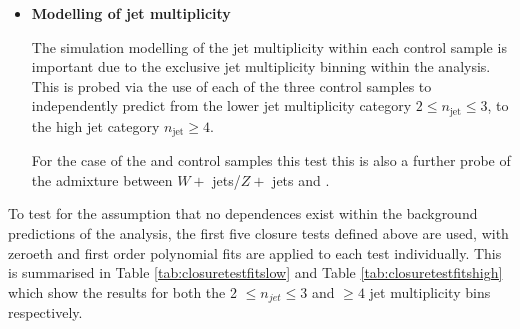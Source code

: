 \begin{itemize}
\item[]\textbf{Modelling of jet multiplicity}

The simulation modelling of the jet multiplicity within each control sample is important due to the exclusive jet multiplicity binning within the analysis. This is probed via the use of each of the three control samples to independently predict from the lower jet multiplicity category $2 \leq n_{\text{jet}} \leq 3$, to the high jet category $n_{\text{jet}} \geq 4$. 

For the case of the \mupjets and \dimupjets control samples this test this is also a further probe of the admixture between $W +$ jets/$Z +$ jets and \ttbar. 
\end{itemize}

To test for the assumption that no \theht dependences exist within the background predictions of the analysis, the first five closure tests defined above are used, with zeroeth and first order polynomial fits are applied to each test individually. This is summarised in Table \ref{tab:closuretestfitslow} and Table \ref{tab:closuretestfitshigh} which show the results for both the 2 $\leq n_{jet} \leq 3$ and $\geq 4$ jet multiplicity bins respectively.

